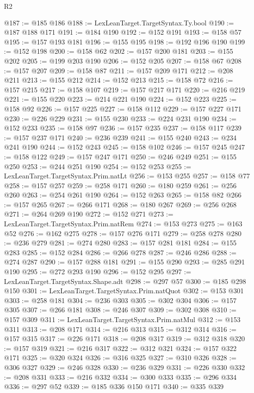 \begin{lexlean}{R2}
\begin{coremodule}
@187 := @185 @186
@188 := LexLeanTarget.TargetSyntax.Ty.bool
@190 := @187 @188 @171
@191 := @184 @190
@192 := @152 @191
@193 := @158 @57
@195 := @157 @193 @181
@196 := @155 @195
@198 := @192 @196 @190
@199 := @152 @198
@200 := @158 @62
@202 := @157 @200 @181
@203 := @155 @202
@205 := @199 @203 @190
@206 := @152 @205
@207 := @158 @67
@208 := @157 @207
@209 := @158 @87
@211 := @157 @209 @171
@212 := @208 @211
@213 := @155 @212
@214 := @152 @213
@215 := @158 @72
@216 := @157 @215
@217 := @158 @107
@219 := @157 @217 @171
@220 := @216 @219
@221 := @155 @220
@223 := @214 @221 @190
@224 := @152 @223
@225 := @158 @92
@226 := @157 @225
@227 := @158 @112
@229 := @157 @227 @171
@230 := @226 @229
@231 := @155 @230
@233 := @224 @231 @190
@234 := @152 @233
@235 := @158 @97
@236 := @157 @235
@237 := @158 @117
@239 := @157 @237 @171
@240 := @236 @239
@241 := @155 @240
@243 := @234 @241 @190
@244 := @152 @243
@245 := @158 @102
@246 := @157 @245
@247 := @158 @122
@249 := @157 @247 @171
@250 := @246 @249
@251 := @155 @250
@253 := @244 @251 @190
@254 := @152 @253
@255 := LexLeanTarget.TargetSyntax.Prim.natLt
@256 := @153 @255
@257 := @158 @77
@258 := @157 @257
@259 := @258 @171
@260 := @180 @259
@261 := @256 @260
@263 := @254 @261 @190
@264 := @152 @263
@265 := @158 @82
@266 := @157 @265
@267 := @266 @171
@268 := @180 @267
@269 := @256 @268
@271 := @264 @269 @190
@272 := @152 @271
@273 := LexLeanTarget.TargetSyntax.Prim.natRem
@274 := @153 @273
@275 := @163 @52
@276 := @162 @275
@278 := @157 @276 @171
@279 := @258 @278
@280 := @236 @279
@281 := @274 @280
@283 := @157 @281 @181
@284 := @155 @283
@285 := @152 @284
@286 := @266 @278
@287 := @246 @286
@288 := @274 @287
@290 := @157 @288 @181
@291 := @155 @290
@293 := @285 @291 @190
@295 := @272 @293 @190
@296 := @152 @295
@297 := LexLeanTarget.TargetSyntax.Shape.adt
@298 := @297 @57
@300 := @185 @298 @150
@301 := LexLeanTarget.TargetSyntax.Prim.natQuot
@302 := @153 @301
@303 := @258 @181
@304 := @236 @303
@305 := @302 @304
@306 := @157 @305
@307 := @266 @181
@308 := @246 @307
@309 := @302 @308
@310 := @157 @309
@311 := LexLeanTarget.TargetSyntax.Prim.natMul
@312 := @153 @311
@313 := @208 @171
@314 := @216 @313
@315 := @312 @314
@316 := @157 @315
@317 := @226 @171
@318 := @208 @317
@319 := @312 @318
@320 := @157 @319
@321 := @216 @317
@322 := @312 @321
@324 := @157 @322 @171
@325 := @320 @324
@326 := @316 @325
@327 := @310 @326
@328 := @306 @327
@329 := @246 @328
@330 := @236 @329
@331 := @226 @330
@332 := @208 @331
@333 := @216 @332
@334 := @300 @333
@335 := @296 @334
@336 := @297 @52
@339 := @185 @336 @150 @171
@340 := @335 @339

\end{coremodule}
\end{lexlean}
